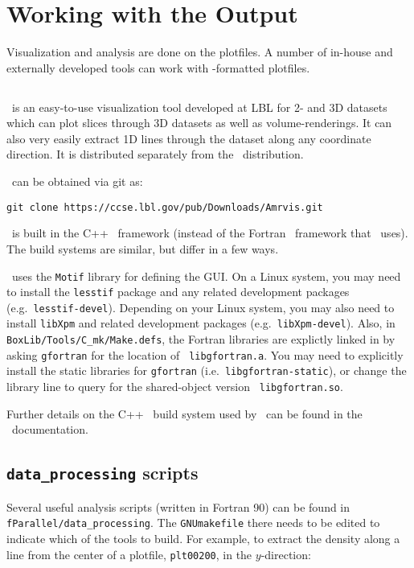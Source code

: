 \section{Working with the Output}

Visualization and analysis are done on the plotfiles.  A
number of in-house and externally developed tools can work 
with \boxlib-formatted plotfiles.


\subsection{\amrvis}

\amrvis\ is an easy-to-use visualization tool developed at LBL for
2- and 3D datasets which can plot slices through 3D datasets as well
as volume-renderings.  It can also very easily extract 1D lines
through the dataset along any coordinate direction.  It is distributed
separately from the \maestro\ distribution.

\amrvis\ can be obtained via git as:
\begin{verbatim}
git clone https://ccse.lbl.gov/pub/Downloads/Amrvis.git
\end{verbatim}
\amrvis\ is built in the C++ \boxlib\ framework (instead of the Fortran 
\boxlib\ framework that \maestro\ uses).  The build systems are similar,
but differ in a few ways.  

\amrvis\ uses the {\tt Motif} library for defining the GUI.  On a Linux 
system, you may need to install the {\tt lesstif} package and any
related development packages (e.g.\ {\tt lesstif-devel}).  Depending
on your Linux system, you may also need to install {\tt libXpm} and
related development packages (e.g.\ {\tt libXpm-devel}).  Also, in
{\tt BoxLib/Tools/C\_mk/Make.defs}, the Fortran libraries are
explictly linked in by asking {\tt gfortran} for the location of {\tt
libgfortran.a}.  You may need to explicitly install the static
libraries for {\tt gfortran} (i.e.\ {\tt libgfortran-static}), or
change the library line to query for the shared-object version {\tt
libgfortran.so}.

Further details on the C++ \boxlib\ build system used by \amrvis\
can be found in the \boxlib\ documentation.


\subsection{{\tt data\_processing} scripts}

Several useful analysis scripts (written in Fortran 90) can be found
in {\tt fParallel/data\_processing}.  The {\tt GNUmakefile} there
needs to be edited to indicate which of the tools to build.  For
example, to extract the density along a line from the center of a
plotfile, {\tt plt00200}, in the $y$-direction:

